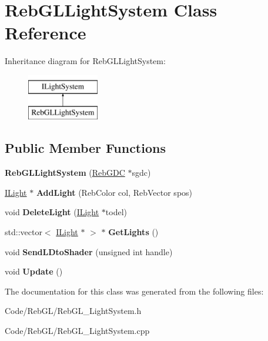 \hypertarget{class_reb_g_l_light_system}{}\section{Reb\+G\+L\+Light\+System Class Reference}
\label{class_reb_g_l_light_system}
Inheritance diagram for Reb\+G\+L\+Light\+System\+:\begin{figure}[H]
\begin{center}
\leavevmode
\includegraphics[height=2.000000cm]{class_reb_g_l_light_system}
\end{center}
\end{figure}
\subsection*{Public Member Functions}
\begin{DoxyCompactItemize}
\item 
{\bfseries Reb\+G\+L\+Light\+System} (\hyperlink{class_reb_g_d_c}{Reb\+G\+DC} $\ast$sgdc)\hypertarget{class_reb_g_l_light_system_acbde1a207f0c396f31aff8be746bc33f}{}\label{class_reb_g_l_light_system_acbde1a207f0c396f31aff8be746bc33f}

\item 
\hyperlink{class_i_light}{I\+Light} $\ast$ {\bfseries Add\+Light} (Reb\+Color col, Reb\+Vector spos)\hypertarget{class_reb_g_l_light_system_ac6f9ac7c9f7c302eb1d215f6ce56221c}{}\label{class_reb_g_l_light_system_ac6f9ac7c9f7c302eb1d215f6ce56221c}

\item 
void {\bfseries Delete\+Light} (\hyperlink{class_i_light}{I\+Light} $\ast$todel)\hypertarget{class_reb_g_l_light_system_a020be292b8eaf4fcb858089bbfba70a9}{}\label{class_reb_g_l_light_system_a020be292b8eaf4fcb858089bbfba70a9}

\item 
std\+::vector$<$ \hyperlink{class_i_light}{I\+Light} $\ast$ $>$ $\ast$ {\bfseries Get\+Lights} ()\hypertarget{class_reb_g_l_light_system_a84447739cfcd5a6979a664e95618c497}{}\label{class_reb_g_l_light_system_a84447739cfcd5a6979a664e95618c497}

\item 
void {\bfseries Send\+L\+Dto\+Shader} (unsigned int handle)\hypertarget{class_reb_g_l_light_system_aec62796ea6d9bbd9338a59879f98df1e}{}\label{class_reb_g_l_light_system_aec62796ea6d9bbd9338a59879f98df1e}

\item 
void {\bfseries Update} ()\hypertarget{class_reb_g_l_light_system_aa278429efa9995c36755e5189741882e}{}\label{class_reb_g_l_light_system_aa278429efa9995c36755e5189741882e}

\end{DoxyCompactItemize}


The documentation for this class was generated from the following files\+:\begin{DoxyCompactItemize}
\item 
Code/\+Reb\+G\+L/Reb\+G\+L\+\_\+\+Light\+System.\+h\item 
Code/\+Reb\+G\+L/Reb\+G\+L\+\_\+\+Light\+System.\+cpp\end{DoxyCompactItemize}
